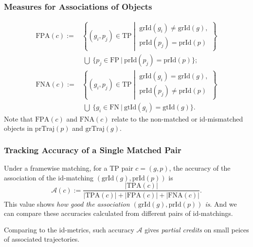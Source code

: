 \documentclass[slidetop, mathserif, dvipsnames]{beamer}
\begin{document}
\begin{frame}
	\frametitle{Measures for Associations of Objects}
			
	\vspace{-20pt}
	\begin{align*}
		\text{FPA}(c) := &             
		\left\{(g_i, p_j)\in\text{TP}\ \left|\ 
		\begin{array}{c}
		\text{grId}(g_i) \neq \text{grId}(g), \\
		\text{prId}(p_j) = \text{prId}(p)
		\end{array}\right.
		\right\} \\
		                 & ~ \bigcup ~ 
		\Big\{p_j\in\text{FP}\ |\ 
		\text{prId}(p_j) = \text{prId}(p)
		\Big\}; \\
		\text{FNA}(c) := &             
		\left\{(g_i, p_j)\in\text{TP}\ \left|\ 
		\begin{array}{c}
		\text{grId}(g_i) = \text{grId}(g), \\
		\text{prId}(p_j) \neq \text{prId}(p)
		\end{array}\right.
		\right\} \\
		                 & ~ \bigcup ~ 
		\Big\{g_i\in\text{FN}\ |\ 
		\text{gtId}(g_i) = \text{gtId}(g)
		\Big\}.
	\end{align*}
	Note that $\text{FPA}(c)$ and $\text{FNA}(c)$ relate to the non-matched
	or id-mismatched objects in $\text{prTraj}(p)$ and $\text{grTraj}(g)$.
			
\end{frame}

\begin{frame}
	\frametitle{Tracking Accuracy of a Single Matched Pair}

	Under a framewise matching, for a TP pair $c=(g,p)$,
	the accuracy of the association of the id-matching $(\text{grId}(g), \text{prId}(p))$
	is
	\[
		\mathcal A(c) := 
		\dfrac{|\text{TPA}(c)|}{|\text{TPA}(c)|+|\text{FPA}(c)|+|\text{FNA}(c)|}.
	\]
	This value shows
	\emph{how good the association $(\text{grId}(g), \text{prId}(p))$ is}.
	And we can compare these accuracies calculated from different pairs
	of id-matchings.

	\vspace{5pt}

	Comparing to the id-metrics, such accuracy $\mathcal A$ gives
	\emph{partial credits} on small peices of associated trajectories.

\end{frame}
\end{document}
